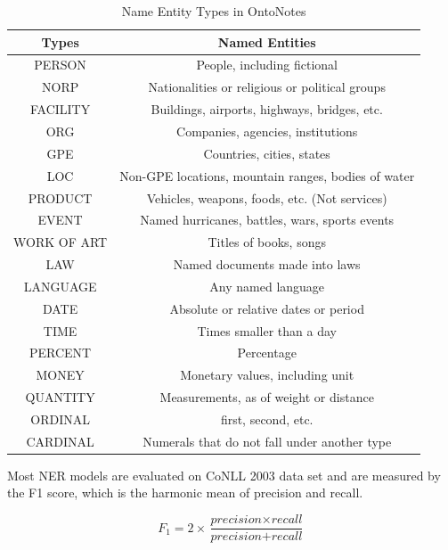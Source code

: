 \begin{table}[]
\centering
\caption{Name Entity Types in OntoNotes}
\label{table:ontonotes-type}
\begin{tabular}{|c|c|} \hline
Types  & Named Entities  \\ \hline
PERSON & People, including fictional \\ \hline
NORP & Nationalities or religious or political groups \\\hline
FACILITY & Buildings, airports, highways, bridges, etc. \\ \hline
ORG & Companies, agencies, institutions \\ \hline
GPE & Countries, cities, states \\ \hline
LOC & Non-GPE locations, mountain ranges, bodies of water \\ \hline
PRODUCT & Vehicles, weapons, foods, etc. (Not services) \\ \hline
EVENT & Named hurricanes, battles, wars, sports events \\ \hline
WORK OF ART & Titles of books, songs \\ \hline
LAW & Named documents made into laws \\ \hline
LANGUAGE & Any named language  \\ \hline
DATE & Absolute or relative dates or period \\ \hline
TIME & Times smaller than a day  \\ \hline 
PERCENT & Percentage \\ \hline
MONEY & Monetary values, including unit \\ \hline
QUANTITY & Measurements, as of weight or distance \\ \hline
ORDINAL & first, second, etc. \\ \hline
CARDINAL & Numerals that do not fall under another type \\ \hline
\end{tabular}
\end{table}

Most NER models are evaluated on CoNLL 2003 data set and are measured by the F1 score, which is the harmonic mean of precision and recall. 

\begin{equation}\label{eqn:softmax}
F_{1} = 2\times \dfrac{\textit{precision} \times \textit{recall}}{\textit{precision} + \textit{recall}}
\end{equation}


